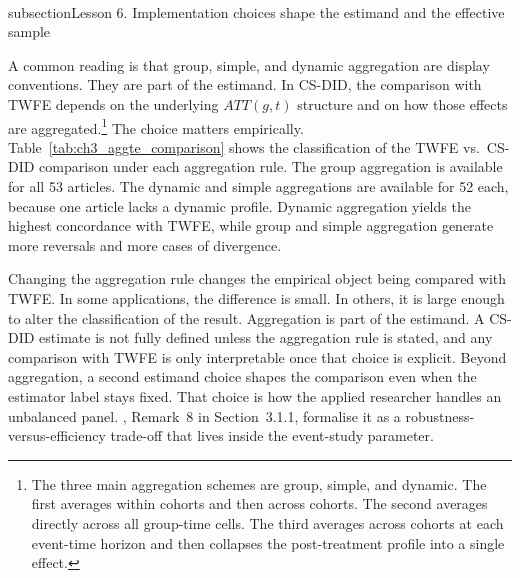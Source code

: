 \documentclass[11pt]{article}
\begin{document}





\newpage
\\subsection{Lesson 6. Implementation choices shape the estimand and the effective sample}

A common reading is that group, simple, and dynamic aggregation are display conventions. They are part of the estimand. In CS-DID, the comparison with TWFE depends on the underlying \(ATT(g,t)\) structure and on how those effects are aggregated.\footnote{The three main aggregation schemes are group, simple, and dynamic. The first averages within cohorts and then across cohorts. The second averages directly across all group-time cells. The third averages across cohorts at each event-time horizon and then collapses the post-treatment profile into a single effect.} The choice matters empirically. Table~\ref{tab:ch3_aggte_comparison} shows the classification of the TWFE vs.\ CS-DID comparison under each aggregation rule. The group aggregation is available for all 53 articles. The dynamic and simple aggregations are available for 52 each, because one article lacks a dynamic profile. Dynamic aggregation yields the highest concordance with TWFE, while group and simple aggregation generate more reversals and more cases of divergence.

Changing the aggregation rule changes the empirical object being compared with TWFE. In some applications, the difference is small. In others, it is large enough to alter the classification of the result. Aggregation is part of the estimand. A CS-DID estimate is not fully defined unless the aggregation rule is stated, and any comparison with TWFE is only interpretable once that choice is explicit. Beyond aggregation, a second estimand choice shapes the comparison even when the estimator label stays fixed. That choice is how the applied researcher handles an unbalanced panel. \textcite{callaway2021difference}, Remark~8 in Section~3.1.1, formalise it as a robustness-versus-efficiency trade-off that lives inside the event-study parameter.


\end{document}
